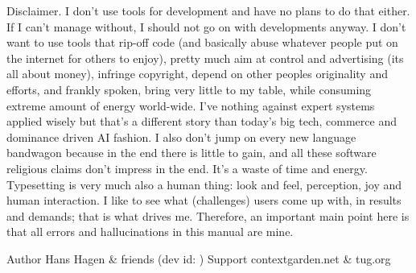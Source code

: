 Disclaimer. I don't use  tools for development
and have no plans to do that either. If I can't manage without, I should not go
on with developments anyway. I don't want to use tools that rip-off code (and
basically abuse whatever people put on the internet for others to enjoy), pretty
much aim at control and advertising (its all about money), infringe copyright,
depend on other peoples originality and efforts, and frankly spoken, bring very
little to my table, while consuming extreme amount of energy world-wide. I've
nothing against expert systems applied wisely but that's a different story than
today's big tech, commerce and dominance driven AI fashion. I also don't jump on
every new language bandwagon because in the end there is little to gain, and all
these software religious claims don't impress in the end. It's a waste of time
and energy. Typesetting is very much also a human thing: look and feel,
perception, joy and human interaction. I like to see what (challenges) users come
up with, in results and demands; that is what drives me. Therefore, an important
main point here is that all errors and hallucinations in this manual are mine.

\par \stop

\starttabulate[|||]
    \NC Author      \NC Hans Hagen & friends        \NC \NR
    \NC \CONTEXT    \NC \contextversion             \NC \NR
    \NC \LUAMETATEX \NC \luametatexverboseversion   %
                        \space (dev id: \luametatexfunctionality)  \NC \NR
    \NC Support     \NC contextgarden.net & tug.org \NC \NR
\stoptabulate

\stopdocument
